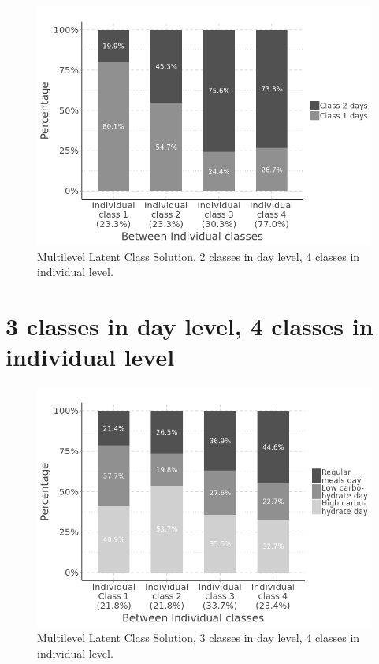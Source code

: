 \begin{figure}[H]
	\centering
	\includegraphics[width=13cm]{Figures/CW2CB4.png}
	\decoRule
	\caption[Multilevel Latent Class Solution (2 $\times$ 4).]{Multilevel Latent Class Solution, 2 classes in day level, 4 classes in individual level.}
	\label{fig:CW2CB4}
\end{figure}

\section{3 classes in day level, 4 classes in individual level}\vspace{-0.3cm}

\begin{figure}[H]
	\centering
	\includegraphics[width=13cm]{Figures/CW3CB4.png}
	\decoRule
	\caption[Multilevel Latent Class Solution (3 $\times$ 4).]{Multilevel Latent Class Solution, 3 classes in day level, 4 classes in individual level.}
	\label{fig:CW3CB4}
\end{figure}


